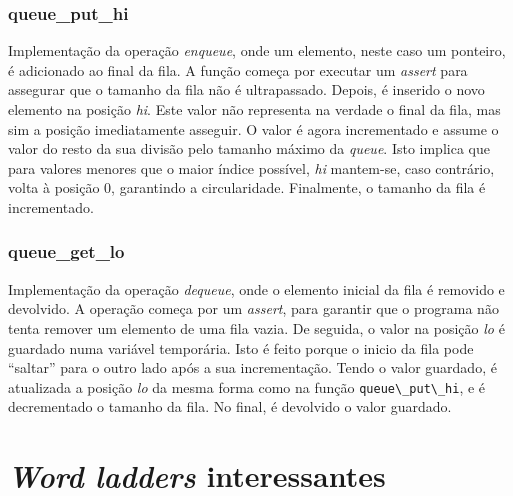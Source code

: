 \documentclass[portuguese,11pt,a4paper,titlepage]{article}
\newcommand{\foreign}[1]{\textit{#1}}
\begin{document}
\subsubsection{queue\_put\_hi}
Implementação da operação \foreign{enqueue}, onde um elemento, neste
caso um ponteiro, é adicionado ao final da fila. A função começa por executar um
\foreign{assert} para assegurar que o tamanho da fila não é ultrapassado. Depois,
é inserido o novo elemento na posição \foreign{hi}. Este valor não representa na
verdade o final da fila, mas sim a posição imediatamente asseguir. O valor é agora
incrementado e assume o valor do resto da sua divisão pelo tamanho máximo da 
\foreign{queue}. Isto implica que para valores menores que o maior índice possível,
\foreign{hi} mantem-se, caso contrário, volta à posição 0, garantindo a circularidade.
Finalmente, o tamanho da fila é incrementado.

\subsubsection{queue\_get\_lo}
Implementação da operação \foreign{dequeue}, onde o elemento inicial da fila é
removido e devolvido. A operação começa por um \foreign{assert}, para garantir
que o programa não tenta remover um elemento de uma fila vazia. De seguida, o valor
na posição \foreign{lo} é guardado numa variável temporária. Isto é feito porque
o inicio da fila pode ``saltar'' para o outro lado após a sua incrementação. Tendo
o valor guardado, é atualizada a posição \foreign{lo} da mesma forma como na função
\verb|queue\_put\_hi|, e é decrementado o tamanho da fila. No final, é devolvido o
valor guardado.

\section{\textit{Word ladders} interessantes}
\end{document}
